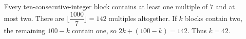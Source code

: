 Every ten-consecutive-integer block contains at least one multiple of $7$ and at most two. There are $\lfloor\dfrac{1000}{7}\rfloor=142$ multiples altogether. If $k$ blocks contain two, the remaining $100-k$ contain one, so $2k+(100-k)=142$. Thus $\boxed{k=42}$.

